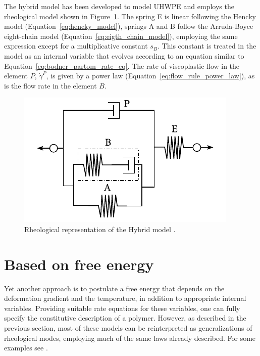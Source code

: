 The hybrid model has been developed to model UHWPE \citep{bergstromConstitutiveModelingUltrahigh2002, bergstromPredictionMultiaxialMechanical2003} and employs the rheological model shown in Figure~\ref{fig:hybrid_model}.
The spring E is linear following the Hencky model (Equation~\eqref{eq:hencky_model}), springs A and B follow the Arruda-Boyce eight-chain model (Equation~\eqref{eq:eigth_chain_model}), employing the same expression except for a multiplicative constant $s_B$.
This constant is treated in the model as an internal variable that evolves according to an equation similar to Equation~\eqref{eq:bodner_partom_rate_eq}.
The rate of viscoplastic flow in the element $P$, $\dot\gamma^P$, is given by a power law (Equation~\eqref{eq:flow_rule_power_law}), as is the flow rate in the element $B$.
\begin{figure}[hbtp]
  \centering
	\includegraphics{figures/hybrid_model}
	\caption{Rheological representation of the Hybrid model \citep{bergstromConstitutiveModelingUltrahigh2002, bergstromPredictionMultiaxialMechanical2003}.}
\label{fig:hybrid_model}
\end{figure}

\section{Based on free energy}

Yet another approach is to postulate a free energy that depends on the deformation gradient and the temperature, in addition to appropriate internal variables.
Providing suitable rate equations for these variables, one can fully specify the constitutive description of a polymer.
However, as described in the previous section, most of these models can be reinterpreted as generalizations of rheological modes, employing much of the same laws already described.
For some examples see \cite{anandTheoryAmorphousSolids2003, ghorbelViscoplasticConstitutiveModel2008,anandThermomechanicallyCoupledTheory2009, amesThermomechanicallyCoupledTheory2009, pouriayevaliConstitutiveDescriptionRatesensitive2013}.

